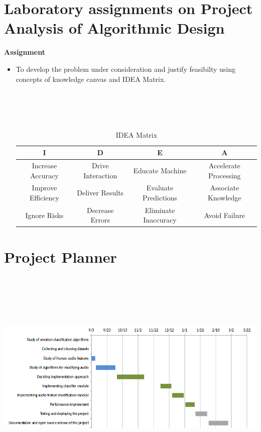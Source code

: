 \documentclass[oneside,a4paper,12pt]{book}
\begin{document}
\begin{appendices}
\chapter{Laboratory assignments on Project Analysis of Algorithmic Design}
\begin{center}
	\textbf{Assignment}
\end{center}
\begin{itemize}
\item[] To develop the problem under consideration and justify feasibilty using
concepts of knowledge canvas and IDEA Matrix.\\\\\\\\\\


\begin{table}[!htbp]
\begin{center}
  \begin{tabular}{| c | c | c | c |}
\hline
 I & D & E & A \\ 
\hline
Increase Accuracy & Drive Interaction & Educate Machine & Accelerate Processing\\
\hline
Improve Efficiency & Deliver Results & Evaluate Predictions & Associate Knowledge \\
 \hline
Ignore Risks & Decrease Errors & Eliminate Inaccuracy & Avoid Failure\\
\hline
\end{tabular}
 \caption { IDEA Matrix }
 \label{tab:imatrix}
\end{center}
\end{table}
\end{itemize}


\chapter{Project Planner}
\label{app:plan}
\includegraphics[height=300pt,width=480pt]{gantt_chart.png}




\end{appendices}
\end{document}
